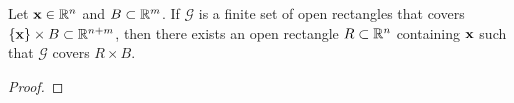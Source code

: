 \documentclass[../main.tex]{subfiles}
\begin{document}
\begin{lemma}\label{lem:18.46}
    Let $\mathbf{x}\in\mathbb{R}^n$ and $B\subset\mathbb{R}^m$. If $\mathcal{G}$ is a finite set of open rectangles that covers $\{\mathbf{x}\}\times B\subset\mathbb{R}^{n+m}$, then there exists an open rectangle $R\subset\mathbb{R}^n$ containing $\mathbf{x}$ such that $\mathcal{G}$ covers $R\times B$.
    \begin{proof}

\end{proof}
\end{lemma}
\end{document}
